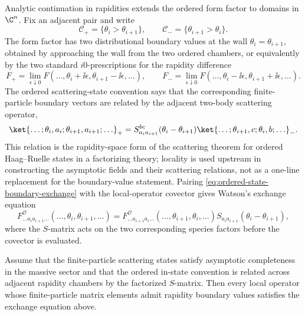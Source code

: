 Analytic continuation in rapidities extends the ordered form factor to
domains in \(\C^n\).  Fix an adjacent pair and write
\[
  \mathcal C_+=\{\theta_i>\theta_{i+1}\},
  \qquad
  \mathcal C_-=\{\theta_{i+1}>\theta_i\}.
\]
The form factor has two distributional boundary values at the wall
\(\theta_i=\theta_{i+1}\), obtained by approaching the wall from the two
ordered chambers, or equivalently by the two standard \(i0\)-prescriptions
for the rapidity difference
\[
  F_+=\lim_{\epsilon\downarrow0}
  F(\ldots,\theta_i+\ii\epsilon,\theta_{i+1}-\ii\epsilon,\ldots),
  \qquad
  F_-=\lim_{\epsilon\downarrow0}
  F(\ldots,\theta_i-\ii\epsilon,\theta_{i+1}+\ii\epsilon,\ldots).
\]
The ordered scattering-state convention says that the corresponding
finite-particle boundary vectors are related by the adjacent two-body
scattering operator,
\begin{equation}
  \ket{\ldots;\theta_i,a_i;\theta_{i+1},a_{i+1};\ldots}_{+}
  =
  S_{a_i a_{i+1}}^{bc}(\theta_i-\theta_{i+1})
  \ket{\ldots;\theta_{i+1},c;\theta_i,b;\ldots}_{-}.
  \label{eq:ordered-state-boundary-exchange}
\end{equation}
This relation is the rapidity-space form of the scattering theorem for
ordered Haag--Ruelle states in a factorizing theory; locality is used
upstream in constructing the asymptotic fields and their scattering
relations, not as a one-line replacement for the boundary-value statement.
Pairing \eqref{eq:ordered-state-boundary-exchange} with the local-operator
covector gives Watson's exchange equation
\[
  F^{\mathcal O}_{\ldots a_i a_{i+1}\ldots}
  (\ldots,\theta_i,\theta_{i+1},\ldots)
  =
  F^{\mathcal O}_{\ldots a_{i+1} a_i\ldots}
  (\ldots,\theta_{i+1},\theta_i,\ldots)
  S_{a_i a_{i+1}}(\theta_i-\theta_{i+1}),
\]
where the \(S\)-matrix acts on the two corresponding species factors before
the covector is evaluated.

\begin{proposition}
\label{prop:form-factor-exchange}
Assume that the finite-particle scattering states satisfy asymptotic
completeness in the massive sector and that the ordered in-state convention is
related across adjacent rapidity chambers by the factorized \(S\)-matrix.
Then every local operator whose finite-particle matrix elements admit
rapidity boundary values satisfies the exchange equation above.
\end{proposition}

